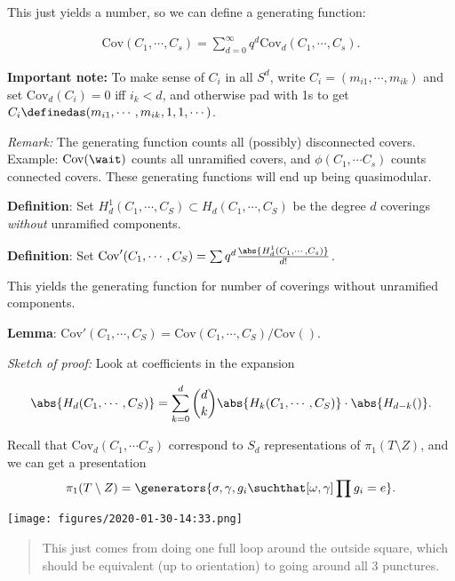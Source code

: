 This just yields a number, so we can define a generating function:

\begin{align*}
\mathrm{Cov}(C_1, \cdots, C_s) = \sum_{d=0}^\infty q^d \mathrm{Cov}_d(C_1, \cdots, C_s)
.\end{align*}

\textbf{Important note:} To make sense of \(C_i\) in all \(S^d\), write
\(C_i = (m_{i1}, \cdots , m_{ik})\) and set \(\mathrm{Cov}_d(C_i) = 0\)
iff \(i_k < d\), and otherwise pad with 1s to get
\(C_i \definedas (m_{i1}, \cdots, m_{ik}, 1, 1, \cdots)\).

\emph{Remark:} The generating function counts all (possibly)
disconnected covers. Example: \(\mathrm{Cov}(\wait)\) counts all
unramified covers, and \(\phi(C_1, \cdots C_s)\) counts connected
covers. These generating functions will end up being quasimodular.

\textbf{Definition}: Set
\(H_d^1(C_1, \cdots, C_S) \subset H_d(C_1, \cdots, C_S)\) be the degree
\(d\) coverings \emph{without} unramified components.

\textbf{Definition}: Set
\(\mathrm{Cov}'(C_1, \cdots, C_S)= \sum q^d \frac{\abs{H_d^1(C_1, \cdots, C_s)}}{d!}\).

This yields the generating function for number of coverings without
unramified components.

\textbf{Lemma}:
\(\mathrm{Cov}' (C_1, \cdots, C_S) = \mathrm{Cov}(C_1, \cdots, C_S) / \mathrm{Cov}()\).

\emph{Sketch of proof:} Look at coefficients in the expansion

\begin{align*}
\abs{H_d(C_1, \cdots, C_S)} = \sum_{k=0}^d {d\choose k} \abs{H_k(C_1, \cdots , C_S)} \cdot \abs{H_{d-k}()}
.\end{align*}

Recall that \(\mathrm{Cov}_d(C_1, \cdots C_S)\) correspond to \(S_d\)
representations of \(\pi_1(T\setminus Z)\), and we can get a
presentation
\begin{align*}\pi_1(T\setminus Z) = \generators{\sigma, \gamma, g_i \suchthat [\omega,\gamma] \prod g_i = e}
.\end{align*}

\texttt{[image: figures/2020-01-30-14:33.png]}\\

\begin{quote}
This just comes from doing one full loop around the outside square,
which should be equivalent (up to orientation) to going around all 3
punctures.
\end{quote}

